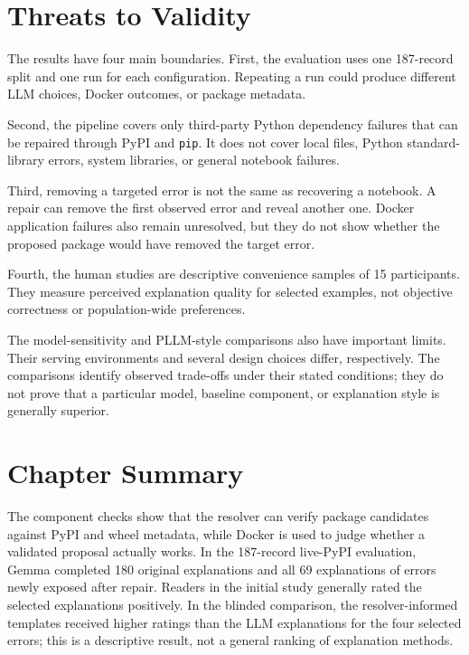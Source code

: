 \fi

\section{Threats to Validity}
\label{sec:v-threats}

The results have four main boundaries. First, the evaluation uses one
187-record split and one run for each configuration. Repeating a run could
produce different LLM choices, Docker outcomes, or package metadata.

Second, the pipeline covers only third-party Python dependency failures that
can be repaired through PyPI and \texttt{pip}. It does not cover local files,
Python standard-library errors, system libraries, or general notebook failures.

Third, removing a targeted error is not the same as recovering a notebook. A
repair can remove the first observed error and reveal another one. Docker
application failures also remain unresolved, but they do not show whether the
proposed package would have removed the target error.

Fourth, the human studies are descriptive convenience samples of 15
participants. They measure perceived explanation quality for selected examples,
not objective correctness or population-wide preferences.

The model-sensitivity and PLLM-style comparisons also have important limits.
Their serving environments and several design choices differ, respectively.
The comparisons identify observed trade-offs under their stated conditions; they
do not prove that a particular model, baseline component, or explanation style
is generally superior.
\label{sec:v-threats-internal}
\label{sec:v-threats-construct}
\label{sec:v-threats-external}
\label{sec:v-threats-conclusion}

\section{Chapter Summary}
\label{sec:v-summary-current}

The component checks show that the resolver can verify package candidates
against PyPI and wheel metadata, while Docker is used to judge whether a
validated proposal actually works. In the 187-record live-PyPI evaluation,
Gemma completed 180 original explanations and all 69 explanations of errors
newly exposed after repair. Readers in the initial study generally rated the
selected explanations positively. In the blinded comparison, the
resolver-informed templates received higher ratings than the LLM explanations
for the four selected errors; this is a descriptive result, not a general
ranking of explanation methods.

